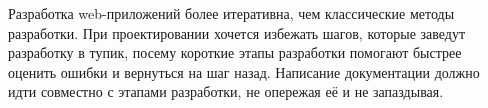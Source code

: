 Разработка web-приложений более итеративна, чем классические методы разработки.  При проектировании хочется избежать шагов, которые заведут разработку в тупик, посему короткие этапы разработки помогают быстрее оценить ошибки и вернуться на шаг назад. Написание документации должно идти совместно с этапами разработки, не опережая её и не запаздывая.

































\clearpage